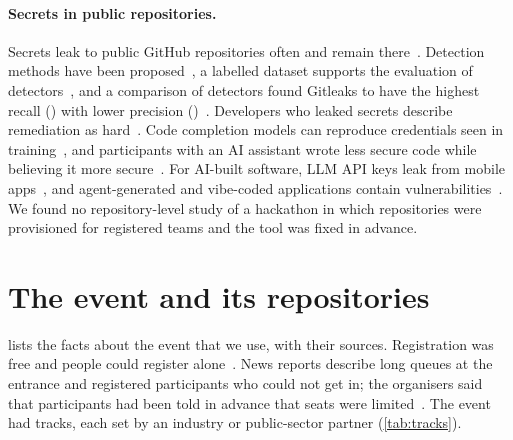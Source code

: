 \documentclass{article}
\begin{document}
\paragraph{Secrets in public repositories.}
Secrets leak to public GitHub repositories often and remain there~\cite{meli2019git}. Detection methods have been proposed~\cite{sinha2015secretkeys}, a labelled dataset supports the evaluation of detectors~\cite{basak2023secretbench}, and a comparison of detectors found Gitleaks to have the highest recall (\gitleaksrecall) with lower precision (\gitleaksprecision)~\cite{basak2023tools}. Developers who leaked secrets describe remediation as hard~\cite{krause2022pushed}. Code completion models can reproduce credentials seen in training~\cite{huang2024codesecret}, and participants with an AI assistant wrote less secure code while believing it more secure~\cite{perry2023insecure}. For AI-built software, LLM API keys leak from mobile apps~\cite{gao2026mindyourkey}, and agent-generated and vibe-coded applications contain vulnerabilities~\cite{zhao2025vibesafe,deng2026vibeinsecurity}. We found no repository-level study of a hackathon in which repositories were provisioned for registered teams and the tool was fixed in advance.

\section{The event and its repositories}\label{sec:event}

 lists the facts about the event that we use, with their sources. Registration was free and people could register alone~\cite{hackalem2026site}. News reports describe long queues at the entrance and registered participants who could not get in; the organisers said that participants had been told in advance that seats were limited~\cite{qumash2026queue,ulys2026survival}. The event had \NTracksCount{} tracks, each set by an industry or public-sector partner (\cref{tab:tracks}).
\end{document}
